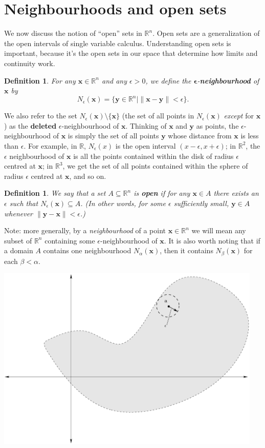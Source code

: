 \documentclass[12pt,letterpaper]{article}
\newtheorem{definition}[theorem]{Definition}
\newcommand{\R}{\mathbb{R}}
\newcommand{\len}[1]{\lVert#1\rVert}
\newcommand{\x}{\mathbf{x}}
\newcommand{\y}{\mathbf{y}}
\begin{document}
\section{Neighbourhoods and open sets}
We now discuss the notion of ``open'' sets in $\R^n$. Open sets are a generalization of the open intervals of single variable calculus. Understanding open sets is important, because it's the open sets in our space that determine how limits and continuity work.
\begin{definition}
For any $\x\in\R^n$ and any $\epsilon> 0$, we define the $\boldsymbol{\epsilon}$-{\bf neighbourhood} of $\x$ by
\[
N_\epsilon(\x) = \{\y\in \R^n| \len{\x-\y}<\epsilon\}.
\]
\end{definition}
We also refer to the set $N_\epsilon(\x)\setminus \{\x\}$ (the set of all points in $N_\epsilon(\x)$ {\em except} for $\x$) as the {\bf deleted} $\epsilon$-neighbourhood of $\x$.  Thinking of $\x$ and $\y$ as points, the $\epsilon$-neighbourhood of $\x$ is simply the set of all points $\y$ whose distance from $\x$ is less than $\epsilon$. For example, in $\R$, $N_\epsilon(x)$ is the open interval $(x-\epsilon,x+\epsilon)$; in $\R^2$, the $\epsilon$ neighbourhood of $\x$ is all the points contained within the disk of radius $\epsilon$ centred at $\x$; in $\R^3$, we get the set of all points contained within the sphere of radius $\epsilon$ centred at $\x$, and so on. 
\begin{definition}
We say that a set $A\subseteq \R^n$ is {\bf open} if for any $\x\in A$ there exists an $\epsilon$ such that $N_\epsilon(\x)\subseteq A$.  (In other words, for some $\epsilon$ sufficiently small, $\y\in A$ whenever $\len{\y-\x}<\epsilon$.)
\end{definition}
Note: more generally, by a {\em neighbourhood} of a point $\x\in\R^n$ we will mean any subset of $\R^n$ containing some $\epsilon$-neighbourhood of $\x$.  It is also worth noting that if a domain $A$ contains one neighbourhood $N_{\alpha}(\x)$, then it contains $N_{\beta}(\x)$ for each $\beta<\alpha$.
\begin{center}
\includegraphics[width=5in]{open.pdf}
\end{center}
\end{document}
